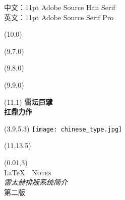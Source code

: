 
\newpage
\thispagestyle{empty}
\vspace*{\fill}
\begin{center}
中文：11pt Adobe Source Han Serif\\
英文：11pt Adobe Source Serif Pro
\end{center}
\vspace{\fill}

\begin{titlepage}

\setlength\parindent{0pt}


\begin{textblock}{6}(10,0)
    \rule{0mm}{420mm}
\end{textblock}

\begin{textblock}{.02}(9.7,0)
    \rule{0mm}{420mm}
\end{textblock}

\begin{textblock}{.02}(9.8,0)
    \rule{0mm}{420mm}
\end{textblock}

\begin{textblock}{.02}(9.9,0)
    \rule{0mm}{420mm}
\end{textblock}

\begin{textblock}{3}(11,1)
    {\Huge \textbf{雷坛巨擘}\\[5pt] \textbf{扛鼎力作}}
\end{textblock}

\begin{textblock}{12.8}(3.9,5.3)
\textblockcolour{}
    \texttt{[image: chinese\_type.jpg]}
\end{textblock}

\begin{textblock}{4}(11,13.5)
    {\huge \textit{\lnotesauthor}}\\[5pt]
    {\Large \lnotesdate}
\end{textblock}

\TPshowboxestrue
\setlength\TPboxrulesize{0.8pt}

\begin{textblock}{14}(0.01,3)
    \centering
    ~\\[20pt]
    {\fontsize{32}{40}\selectfont \LaTeX\ \ \textsc{Notes}}\\[8pt]
    {\huge \textit{雷太赫排版系统简介}}\\[8pt]
    第二版\ \ \lnotesversion\\[20pt]
\end{textblock}
~
\end{titlepage}
